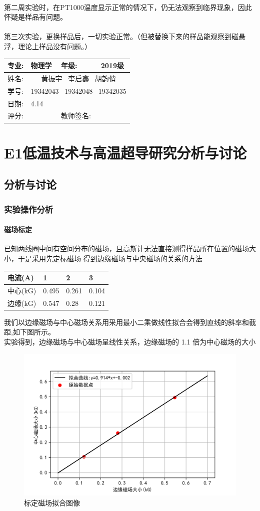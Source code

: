 \documentclass{ctexart}
\newcommand{\experimentname}{E1低温技术与高温超导研究}
\newcommand{\student}{黄振宇  \ 奎启鑫 \ 胡韵俏}
\newcommand{\Grade}{2019级}
\newcommand{\stuID}{19342043  \ 19342048 \ 19342035}
\newcommand{\reviewdate}{4.14}
\theoremstyle{ansstyle}
\newcommand{\reviewdata}{%
	\begin{center}
		\begin{tabular}{|p{2cm}|p{4cm}|p{4cm}|p{4cm}|}
			\hline
			专业: & 物理学 & 年级:  & \Grade \\
			\hline
			姓名:  & \multicolumn{3}{c|}{\student} \\
			\hline 
			学号:  & \multicolumn{3}{c|}{\stuID} \\
			\hline
			日期: & \reviewdate & & \\
			\hline
			评分: & & 教师签名: & \\
			\hline
		\end{tabular}
	\end{center}%
}
\begin{document}
  \paragraph{}第二周实验时，在PT1000温度显示正常的情况下，仍无法观察到临界现象，因此怀疑是样品有问题。
  \paragraph{}第三次实验，更换样品后，一切实验正常。（但被替换下来的样品能观察到磁悬浮，理论上样品没有问题。）

\newpage


\reviewdata

\section*{\experimentname 分析与讨论}


\subsection{分析与讨论}
\subsubsection{实验操作分析}
\paragraph[short]{磁场标定}  已知两线圈中间有空间分布的磁场，且高斯计无法直接测得样品所在位置的磁场大小，于是采用先定标磁场
得到边缘磁场与中央磁场的关系的方法
\begin{table}[H]
\centering
\begin{tabular}{@{}llll@{}}
\toprule
电流(A)  & 1     & 2     & 3     \\ \midrule
中心(kG) & 0.495 & 0.261 & 0.104 \\
边缘(kG) & 0.547 & 0.28  & 0.121  \\ \bottomrule
\end{tabular}
\end{table}
我们以边缘磁场与中心磁场关系用采用最小二乘做线性拟合会得到直线的斜率和截距,如下图所示。
\\
实验得到，边缘磁场与中心磁场呈线性关系，边缘磁场的 1.1 倍为中心磁场的大小
\begin{figure}[H]
	\centering
	\caption{标定磁场拟合图像}

	\includegraphics[width=0.75\linewidth]{./png/q1.png}
\end{figure}
\end{document}
